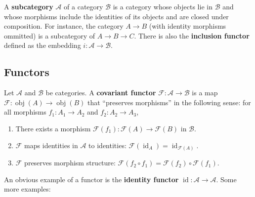 \documentclass[11pt]{article}
\newcommand{\obj}{\operatorname{obj}}
\newcommand{\id}{\operatorname{id}}
\newcommand{\A}{\mathscr{A}}
\newcommand{\B}{\mathscr{B}}
\newcommand{\F}{\mathcal{F}}
\begin{document}
A \textbf{subcategory} $\A$ of a category $\B$ is a category whose objects lie in $\B$ and whose morphisms include the identities of its objects and are closed under composition. For instance, the category $A \to B$ (with identity morphisms ommitted) is a subcategory of $A \to B \to C$. There is also the \textbf{inclusion functor} defined as the embedding $i : \A \to \B$.


\subsection{Functors}

Let $\A$ and $\B$ be categories. A \textbf{covariant functor} $\F : \A \to \B$ is a map $\F : \obj(A) \to \obj(B)$ that ``preserves morphisms'' in the following sense: for all morphisms $f_{1} : A_{1} \to A_{2}$ and $f_{2} : A_{2} \to A_{3}$,
\begin{enumerate}
  \item There exists a morphism $\F(f_{1}) : \F(A) \to \F(B)$ in $\B$.
  \item $\F$ maps identities in $\A$ to identities: $\F(\id_{A}) = \id_{\F(A)}$.
  \item $\F$ preserves morphism structure: $\F(f_{2} \circ f_{1}) = \F(f_{2}) \circ \F(f_{1})$.
\end{enumerate}

\newpage

An obvious example of a functor is the \textbf{identity functor} $\id : \A \to \A$. Some more examples: 
\end{document}
